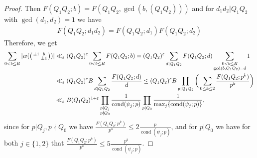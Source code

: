 \documentclass[12pt]{amsart}
\theoremstyle{definition}
\theoremstyle{remark}
\numberwithin{equation}{section}
\newcommand{\cond}{\operatorname{cond}}
\newcommand{\1}{{\mathbf 1}}
\newcommand{\eps}{\varepsilon}
\begin{document}
\begin{proof}
Then  $F(Q_1 Q_2; b) = F(Q_1 Q_2, \gcd(b,(Q_1Q_2)))$ and for $d_1 d_2|Q_1Q_2$ with $\gcd(d_1,d_2)=1$  we have \begin{align*}
    F(Q_1 Q_2; d_1 d_2) = F(Q_1 Q_2; d_1 ) F(Q_1 Q_2; d_2)
\end{align*}
Therefore, we get
\begin{align*}
    \sum_{0<b \leq B}  | w(\smqty(\pm 1 & b \\  & \pm 1))| &\ll_\eps (Q_1Q_2)^{\eps} \sum_{0<b \leq B}   F(Q_1 Q_2; b)  =(Q_1Q_2)^{\eps} \sum_{d | Q_1 Q_2} F(Q_1 Q_2; d)  \sum_{\substack{0<b \leq B \\ \gcd(b,Q_1Q_2)=d}} 1 \\
    &\ll_\eps (Q_1Q_2)^{\eps}  B \sum_{d | Q_1 Q_2} \frac{F(Q_1 Q_2; d)}{d} \leq (Q_1Q_2)^{\eps} B \prod_{p| Q_1 Q_2} \bigg( \sum_{0 \leq k \leq 2 } \frac{F(Q_1 Q_2; p^k)}{p^k} \bigg)    \\
   & \ll_\eps B (Q_1Q_2)^{1+\eps} \prod_{\substack{p| Q_j \\ p \nmid Q_0}} \frac{1}{\cond(\psi_j;p)}  \prod_{\substack{ p \mid Q_0}} \frac{1}{\max_j \{\cond(\psi_j;p)\}},
\end{align*}
since for $p|Q_j,p\nmid Q_0$ we have $\frac{F(Q_1 Q_2; p^k)}{p^k}  \leq 2\frac{p}{\cond(\psi_j;p)}$, and for $p| Q_0$ we have for both $j\in\{1,2\}$ that $\frac{F(Q_1 Q_2; p^k)}{p^k}  \leq 5\frac{p^2}{\cond(\psi_j;p)}$.
\end{proof}
\end{document}
